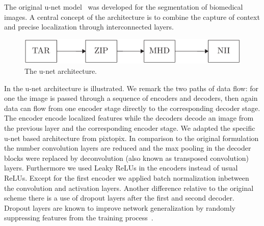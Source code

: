 The original u-net model~\cite{Ronneberger15} was developed for the
segmentation of biomedical images. A central concept of the architecture is to
combine the capture of context and precise localization through interconnected
layers.
\begin{figure}[h]
  \centering
  \includegraphics[page=3,width=.8\linewidth]{figure/diagrams.pdf}
  \caption{The u-net architecture.
  }\label{fig:unet:gen}
\end{figure}
In  the u-net architecture is illustrated. We remark the
two paths of data flow: for one the image is passed through a sequence of
encoders and decoders, then again data can flow from one encoder stage
directly to the corresponding decoder stage. The encoder encode localized
features while the decoders decode an image from the previous layer and the
corresponding encoder stage.
We adapted the specific u-net based architecture from pixtopix. In comparison
to the original formulation the number convolution layers are reduced and
the max pooling in the decoder blocks were replaced by deconvolution (also known
as transposed convolution) layers. Furthermore we used Leaky ReLUs in the
encoders instead of usual ReLUs. Except for the first encoder we applied batch
normalization inbetween the convolution and activation layers. Another
difference relative to the original scheme there is a use of dropout layers
after the first and second decoder. Dropout layers are known to improve
network generalization by randomly suppressing features from the training
process~\cite{Srivastava2014}.
